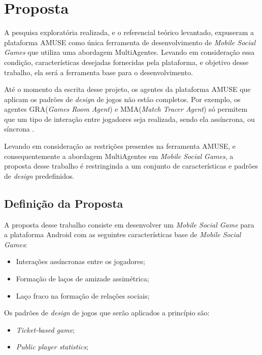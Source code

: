 \chapter[Proposta]{Proposta}
\label{chapter:proposta}

A pesquisa exploratória realizada, e o referencial teórico levantado, expuseram a
plataforma AMUSE como única ferramenta de desenvolvimento de \textit{Mobile Social Games}
que utiliza uma abordagem MultiAgentes. Levando em consideração essa condição,
características desejadas fornecidas pela plataforma, e objetivo desse trabalho, ela
será a ferramenta base para o desenvolvimento.

Até o momento da escrita desse projeto, os agentes da plataforma AMUSE que
aplicam os padrões de \textit{design} de jogos não estão completos.
Por exemplo, os agentes GRA(\textit{Games Room Agent}) e MMA(\textit{Match Tracer Agent})
só permitem que um tipo de interação entre jogadores seja realizada,
sendo ela assíncrona, ou síncrona \cite{bergenti2013}.

Levando em consideração as restrições presentes na ferramenta AMUSE, e consequentemente a
abordagem MultiAgentes em \textit{Mobile Social Games}, a proposta desse trabalho
é restringinda a um conjunto de características e padrões de \textit{design} predefinidos.

\section{Definição da Proposta}

A proposta desse trabalho consiste em desenvolver um \textit{Mobile Social Game} para a
plataforma Android com as seguintes características base de \textit{Mobile Social Games}:

\begin{itemize}
  \item Interações assíncronas entre os jogadores;
  \item Formação de laços de amizade assimétrica;
  \item Laço fraco na formação de relações sociais;
\end{itemize}

Os padrões de \textit{design} de jogos que serão aplicados a princípio são:

\begin{itemize}
  \item \textit{Ticket-based game};
  \item \textit{Public player statistics};
\end{itemize}

